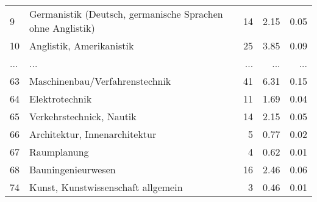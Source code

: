 \begin{longtable}{lXrrr}
        9 & \multicolumn{1}{X}{Germanistik (Deutsch, germanische Sprachen ohne Anglistik)} & %
          \num{14} &
          \num[round-mode=places,round-precision=2]{2.15} &
          \num[round-mode=places,round-precision=2]{0.05} \\
        10 & \multicolumn{1}{X}{Anglistik, Amerikanistik} & %
          \num{25} &
          \num[round-mode=places,round-precision=2]{3.85} &
          \num[round-mode=places,round-precision=2]{0.09} \\
       ... & ... & ... & ... & ... \\
        63 & \multicolumn{1}{X}{Maschinenbau/Verfahrenstechnik} & %
          \num{41} &
          \num[round-mode=places,round-precision=2]{6.31} &
          \num[round-mode=places,round-precision=2]{0.15} \\

        64 & \multicolumn{1}{X}{Elektrotechnik} & %
          \num{11} &
          \num[round-mode=places,round-precision=2]{1.69} &
          \num[round-mode=places,round-precision=2]{0.04} \\

        65 & \multicolumn{1}{X}{Verkehrstechnick, Nautik} & %
          \num{14} &
          \num[round-mode=places,round-precision=2]{2.15} &
          \num[round-mode=places,round-precision=2]{0.05} \\

        66 & \multicolumn{1}{X}{Architektur, Innenarchitektur} & %
          \num{5} &
          \num[round-mode=places,round-precision=2]{0.77} &
          \num[round-mode=places,round-precision=2]{0.02} \\

        67 & \multicolumn{1}{X}{Raumplanung} & %
          \num{4} &
          \num[round-mode=places,round-precision=2]{0.62} &
          \num[round-mode=places,round-precision=2]{0.01} \\

        68 & \multicolumn{1}{X}{Bauningenieurwesen} & %
          \num{16} &
          \num[round-mode=places,round-precision=2]{2.46} &
          \num[round-mode=places,round-precision=2]{0.06} \\

        74 & \multicolumn{1}{X}{Kunst, Kunstwissenschaft allgemein} & %
          \num{3} &
          \num[round-mode=places,round-precision=2]{0.46} &
          \num[round-mode=places,round-precision=2]{0.01} \\


\end{longtable}
